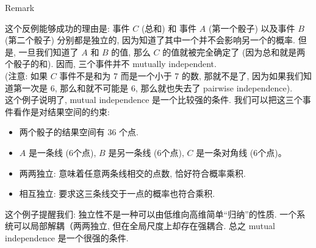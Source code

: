 \begin{qlremark}{Remark}

这个反例能够成功的理由是: 事件 \(\mathit{C}\) (总和) 和 事件 \(\mathit{A}\) (第一个骰子) 以及事件 \(\mathit{B}\) (第二个骰子) 分别都是独立的, 因为知道了其中一个并不会影响另一个的概率. 但是, 一旦我们知道了 \(\mathit{A}\) 和 \(\mathit{B}\) 的值, 那么 \(\mathit{C}\) 的值就被完全确定了 (因为总和就是两个骰子的和). 因而, 三个事件并不 mutually independent.\\
(注意: 如果 \(\mathit{C}\) 事件不是和为 7 而是一个小于 7 的数, 那就不是了, 因为如果我们知道第一次是 6, 那么和就不可能是 6, 那么就也失去了 pairwise independence).\\
这个例子说明了, mutual independence 是一个比较强的条件. 我们可以把这三个事件看作是对结果空间的约束:

\begin{itemize}
\item
  两个骰子的结果空间有 36 个点.
\item
  \(\mathit{A}\) 是一条线 (6个点), \(\mathit{B}\) 是另一条线 (6个点), \(\mathit{C}\) 是一条对角线 (6个点)。
\item
  两两独立: 意味着任意两条线相交的点数, 恰好符合概率乘积.
\item
  相互独立: 要求这三条线交于一点的概率也符合乘积.
\end{itemize}

这个例子提醒我们: 独立性不是一种可以由低维向高维简单``归纳''的性质. 一个系统可以局部解耦（两两独立, 但在全局尺度上却存在强耦合. 总之 mutual independence 是一个很强的条件.

\end{qlremark}


